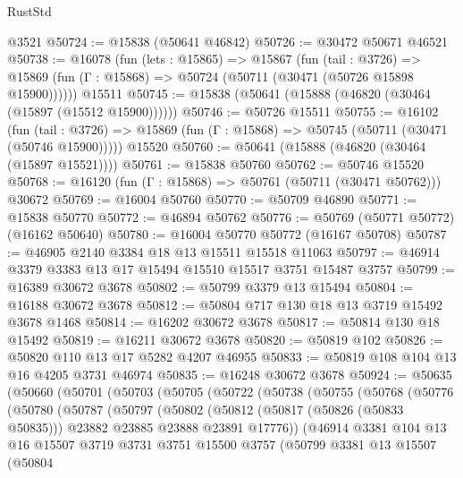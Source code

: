 \begin{lexlean}{RustStd}
\begin{coremodule}
    @3521
@50724 := @15838 (@50641 @46842)
@50726 := @30472 @50671 @46521
@50738 := @16078
    (fun (lets : @15865) =>
    @15867
      (fun (tail : @3726) =>
      @15869 (fun (Γ : @15868) => @50724 (@50711 (@30471 (@50726 @15898 @15900))))))
    @15511
@50745 := @15838 (@50641 (@15888 (@46820 (@30464 (@15897 (@15512 @15900))))))
@50746 := @50726 @15511
@50755 := @16102
    (fun (tail : @3726) => @15869 (fun (Γ : @15868) => @50745 (@50711 (@30471 (@50746 @15900)))))
    @15520
@50760 := @50641 (@15888 (@46820 (@30464 (@15897 @15521))))
@50761 := @15838 @50760
@50762 := @50746 @15520
@50768 := @16120 (fun (Γ : @15868) => @50761 (@50711 (@30471 @50762))) @30672
@50769 := @16004 @50760
@50770 := @50709 @46890
@50771 := @15838 @50770
@50772 := @46894 @50762
@50776 := @50769 (@50771 @50772) (@16162 @50640)
@50780 := @16004 @50770 @50772 (@16167 @50708)
@50787 := @46905 @2140 @3384 @18 @13 @15511 @15518 @11063
@50797 := @46914 @3379 @3383 @13 @17 @15494 @15510 @15517 @3751 @15487 @3757
@50799 := @16389 @30672 @3678
@50802 := @50799 @3379 @13 @15494
@50804 := @16188 @30672 @3678
@50812 := @50804 @717 @130 @18 @13 @3719 @15492 @3678 @1468
@50814 := @16202 @30672 @3678
@50817 := @50814 @130 @18 @15492
@50819 := @16211 @30672 @3678
@50820 := @50819 @102
@50826 := @50820 @110 @13 @17 @5282 @4207 @46955
@50833 := @50819 @108 @104 @13 @16 @4205 @3731 @46974
@50835 := @16248 @30672 @3678
@50924 := @50635
    (@50660
      (@50701
        (@50703
          (@50705
            (@50722
              (@50738
                (@50755
                  (@50768
                    (@50776
                      (@50780
                        (@50787
                          (@50797
                            (@50802
                              (@50812
                                (@50817 (@50826 (@50833 @50835)))
                                @23882
                                @23885
                                @23888
                                @23891
                                @17776))
                            (@46914
                              @3381
                              @104
                              @13
                              @16
                              @15507
                              @3719
                              @3731
                              @3751
                              @15500
                              @3757
                              (@50799
                                @3381
                                @13
                                @15507
                                (@50804

\end{coremodule}
\end{lexlean}
